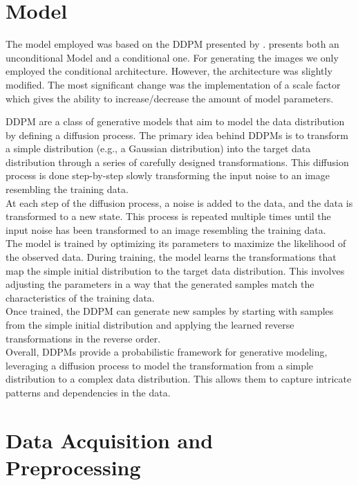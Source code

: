 \documentclass[12pt]{article}
\theoremstyle{plain}
\theoremstyle{definition}
\theoremstyle{remark}
\begin{document}
\newpage

\section{Model}
\label{sec:model}
The model employed was based on the \ac{DDPM} presented by \cite{Ho2020}. \cite{Ho2020} presents both an unconditional Model and a conditional one. For generating the images we only employed the conditional architecture. However, the architecture was slightly modified. The most significant change was the implementation of a scale factor which gives the ability to increase/decrease the amount of model parameters. 

\ac{DDPM} are a class of generative models that aim to model the data distribution by defining a diffusion process. The primary idea behind \ac{DDPM}s is to transform a simple distribution (e.g., a Gaussian distribution) into the target data distribution through a series of carefully designed transformations. This diffusion process is done step-by-step slowly transforming the input noise to an image resembling the training data. \\
At each step of the diffusion process, a noise is added to the data, and the data is transformed to a new state. This process is repeated multiple times until the input noise has been transformed to an image resembling the training data. \\
The model is trained by optimizing its parameters to maximize the likelihood of the observed data. During training, the model learns the transformations that map the simple initial distribution to the target data distribution. This involves adjusting the parameters in a way that the generated samples match the characteristics of the training data.\\
Once trained, the DDPM can generate new samples by starting with samples from the simple initial distribution and applying the learned reverse transformations in the reverse order.\\

Overall, DDPMs provide a probabilistic framework for generative modeling, leveraging a diffusion process to model the transformation from a simple distribution to a complex data distribution. This allows them to capture intricate patterns and dependencies in the data.

\section{Data Acquisition and Preprocessing}
\label{sec:dataAca_and_preprocessing}
\end{document}
